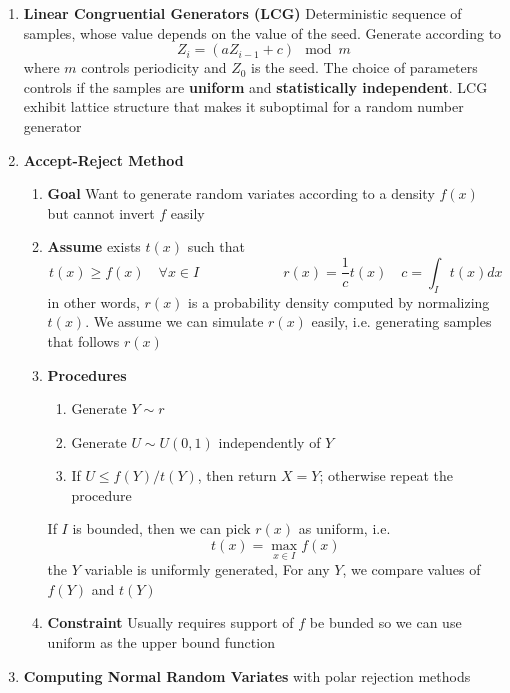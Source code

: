 \documentclass[11pt]{article}
\begin{document}
\begin{enumerate}
    \item \textbf{Linear Congruential Generators (LCG)} Deterministic sequence of samples, whose value depends on the value of the seed. Generate according to 
    \[
        Z_i = (a Z_{i-1} + c) \mod m  
    \]
    where $m$ controls periodicity and $Z_0$ is the seed. The choice of parameters controls if the samples are \textbf{uniform} and \textbf{statistically independent}. LCG exhibit lattice structure that makes it suboptimal for a random number generator 
    \item \textbf{Accept-Reject Method}
    \begin{enumerate}
        \item \textbf{Goal} Want to generate random variates according to a density $f(x)$ but cannot invert $f$ easily
        \item \textbf{Assume} exists $t(x)$ such that 
        \[
            t(x)\geq f(x) \quad \forall x\in I  
            \qquad \qquad \qquad 
            r(x) = \frac{1}{c} t(x) \quad c = \int_I t(x) dx
        \]
        in other words, $r(x)$ is a probability density computed by normalizing $t(x)$. We assume we can simulate $r(x)$ easily, i.e. generating samples that follows $r(x)$
        \item \textbf{Procedures} 
        \begin{enumerate}
            \item Generate $Y\sim r$
            \item Generate $U\sim U(0,1)$ independently of $Y$
            \item If $U\leq f(Y) / t(Y)$, then return $X=Y$; otherwise repeat the procedure
        \end{enumerate}
        If $I$ is bounded, then we can pick $r(x)$ as uniform, i.e. 
        \[
            t(x) = \max_{x\in I} f(x)  
        \]
        the $Y$ variable is uniformly generated, For any $Y$, we compare values of $f(Y)$ and $t(Y)$
        \item \textbf{Constraint} Usually requires support of $f$ be bunded so we can use uniform as the upper bound function
    \end{enumerate}
    \item \textbf{Computing Normal Random Variates} with polar rejection methods
\end{enumerate}



\end{document}
